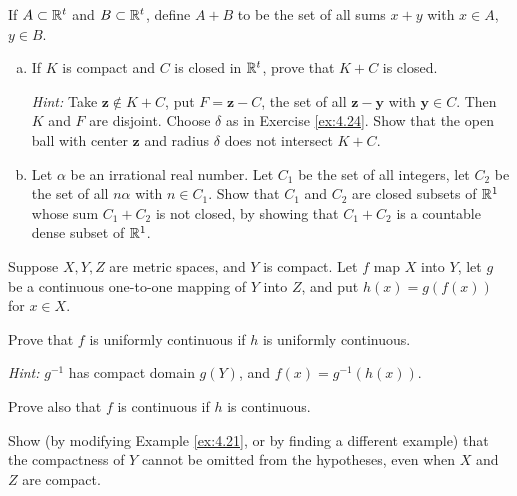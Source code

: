 \begin{myexercise}
    \label{ex:4.25}
    If $A \subset {\protect\mathbb R}^t$ and $B \subset {\protect\mathbb R}^t$, 
    define $A + B$ to be the set of all sums $x + y$ with $x \in A$, $y \in B$.
    \begin{enumerate}[(a)]
        \item If $K$ is compact and $C$ is closed in ${\protect\mathbb R}^t$, 
        prove that $K + C$ is closed.

        \emph{Hint:} Take $\mathbf{z} \not\in K + C$, put $F= \mathbf{z}- C$, the set of all $\mathbf{z- y}$ with $\mathbf{y} \in C$. 
        Then $K$ and $F$ are disjoint. 
        Choose $\delta$ as in Exercise \ref{ex:4.24}. 
        Show that the open ball with center $\mathbf{z}$ and radius $\delta$ does not intersect $K + C$.
        \item Let $\alpha$ be an irrational real number. 
        Let $C_1$ be the set of all integers, 
        let $C_2$ be the set of all $n\alpha$ with $n \in C_1$. 
        Show that $C_1$ and $C_2$ are closed subsets of ${\protect\mathbb R}^1$ whose
        sum $C_1 + C_2$ is not closed, by showing that $C_1 + C_2$ is a countable dense subset of ${\protect\mathbb R}^1$.
    \end{enumerate}
\end{myexercise}


\begin{myexercise}
    \label{ex:4.26}
    Suppose $X, Y, Z$ are metric spaces, and $Y$ is compact. 
    Let $f$ map $X$ into $Y$, 
    let $g$ be a continuous one-to-one mapping of $Y$ into $Z$, 
    and put $h(x) = g(f(x))$ for $x \in X$.

    Prove that $f$ is uniformly continuous if $h$ is uniformly continuous.
    
    \emph{Hint:} $g^{-1}$ has compact domain $g(Y)$, and $f(x) = g^{-1}(h(x))$. 
    
    Prove also that $f$ is continuous if $h$ is continuous. 

    Show (by modifying Example \ref{ex:4.21}, or by finding a different example) that the compactness of $Y$ cannot be omitted from the hypotheses, even when $X$ and $Z$ are compact.
\end{myexercise}